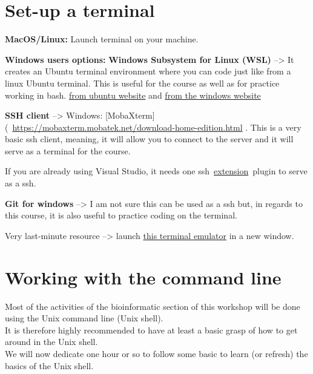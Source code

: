 \documentclass[
]{book}
\begin{document}
\hypertarget{set-up-a-terminal}{%
\section{Set-up a terminal}\label{set-up-a-terminal}}

\textbf{MacOS/Linux:} Launch terminal on your machine.

\textbf{Windows users options:}
\textbf{Windows Subsystem for Linux (WSL)} --\textgreater{} It creates an Ubuntu terminal environment where you can code just like from a linux Ubuntu terminal. This is useful for the course as well as for practice working in bash. \href{https://ubuntu.com/wsl}{from ubuntu website} and \href{https://learn.microsoft.com/en-us/windows/wsl/install}{from the windows website}

\textbf{SSH client} --\textgreater{} Windows: {[}MobaXterm{]}(~\url{https://mobaxterm.mobatek.net/download-home-edition.html} . This is a very basic ssh client, meaning, it will allow you to connect to the server and it will serve as a terminal for the course.

If you are already using Visual Studio, it needs one ssh~\href{https://code.visualstudio.com/docs/remote/ssh}{extension}~plugin to serve as a ssh.

\textbf{Git for windows} --\textgreater{} I am not sure this can be used as a ssh but, in regards to this course, it is also useful to practice coding on the terminal.

Very last-minute resource --\textgreater{} launch \href{https://bellard.org/jslinux/vm.html?url=alpine-x86.cfg\&mem=192}{this terminal emulator} in a new window.

\hypertarget{working-with-the-command-line}{%
\section{Working with the command line}\label{working-with-the-command-line}}

Most of the activities of the bioinformatic section of this workshop will be done using the Unix command line (Unix shell).\\
It is therefore highly recommended to have at least a basic grasp of how to get around in the Unix shell.\\
We will now dedicate one hour or so to follow some basic to learn (or refresh) the basics of the Unix shell.
\end{document}
